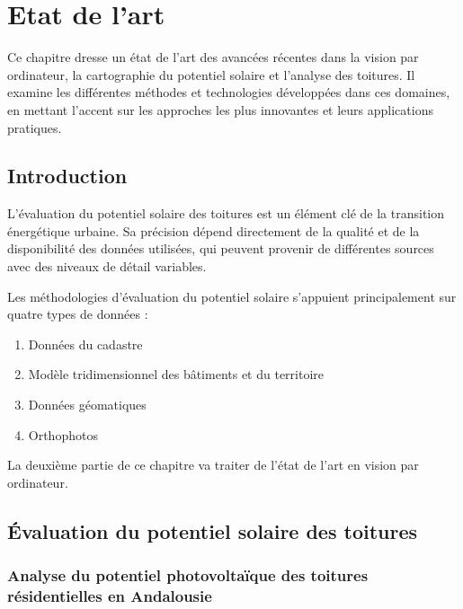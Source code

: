 \chapter{Etat de l'art}
\label{chap:analysis}

Ce chapitre dresse un état de l'art des avancées récentes dans la vision par ordinateur, la cartographie du potentiel solaire et l'analyse des toitures. Il examine les différentes méthodes et technologies développées dans ces domaines, en mettant l'accent sur les approches les plus innovantes et leurs applications pratiques.

\localtableofcontents

\newpage

\section{Introduction}
\par{L'évaluation du potentiel solaire des toitures est un élément clé de la transition énergétique urbaine. Sa précision dépend directement de la qualité et de la disponibilité des données utilisées, qui peuvent provenir de différentes sources avec des niveaux de détail variables.}

\par{Les méthodologies d'évaluation du potentiel solaire s'appuient principalement sur quatre types de données :}
\begin{enumerate}
    \item Données du cadastre
    \item Modèle tridimensionnel des bâtiments et du territoire
    \item Données géomatiques
    \item Orthophotos
\end{enumerate}

\par{La deuxième partie de ce chapitre va traiter de l'état de l'art en vision par ordinateur.}

\section{Évaluation du potentiel solaire des toitures}

\subsection{Analyse du potentiel photovoltaïque des toitures résidentielles en Andalousie}

